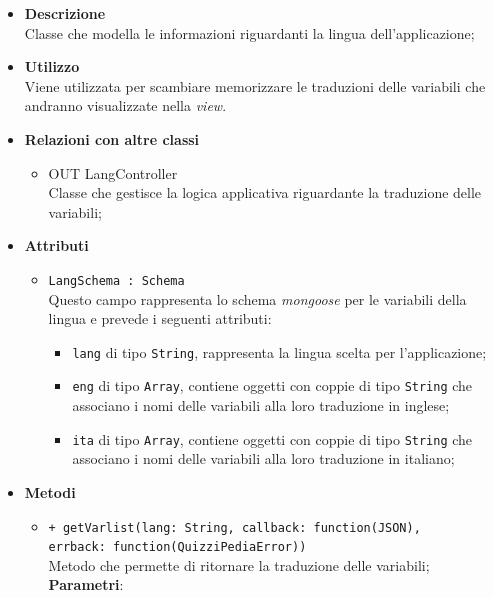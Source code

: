 	\begin{itemize}
		\item \textbf{Descrizione} \\
		Classe che modella le informazioni riguardanti la lingua dell'applicazione;
		\item \textbf{Utilizzo} \\
		Viene utilizzata per scambiare memorizzare le traduzioni delle variabili che andranno visualizzate nella \textit{view}.
		\item \textbf{Relazioni con altre classi} \\
			\begin{itemize}
				\item OUT LangController \\
				Classe che gestisce la logica applicativa riguardante la traduzione delle variabili;
			\end{itemize}
		\item \textbf{Attributi} \\
			\begin{itemize}
				\item \texttt{LangSchema : Schema} \\
				Questo campo rappresenta lo schema \textit{mongoose} per le variabili della lingua e prevede i seguenti attributi:
					\begin{itemize}
						\item \texttt{lang} di tipo \texttt{String}, rappresenta la lingua scelta per l'applicazione;
						\item \texttt{eng} di tipo \texttt{Array}, contiene oggetti con coppie di tipo \texttt{String} che associano i nomi delle variabili alla loro traduzione in inglese;
						\item \texttt{ita} di tipo \texttt{Array}, contiene oggetti con coppie di tipo \texttt{String} che associano i nomi delle variabili alla loro traduzione in italiano;
					\end{itemize}
			\end{itemize}
		\item \textbf{Metodi}
			\begin{itemize}
				\item \texttt{+ getVarlist(lang: String, callback: function(JSON), \\ errback: function(QuizziPediaError))} \\
				Metodo che permette di ritornare la traduzione delle variabili; \\
				\textbf{Parametri}:
					\begin{itemize}

\end{itemize}
\end{itemize}
\end{itemize}

